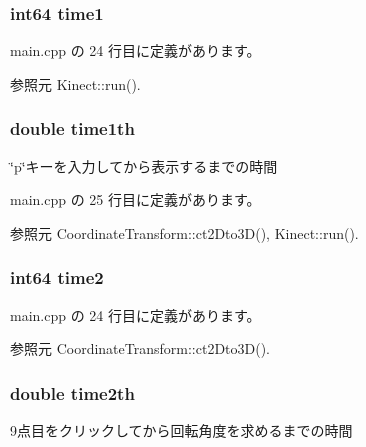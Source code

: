 \subsubsection[{time1}]{\setlength{\rightskip}{0pt plus 5cm}int64 time1}\label{_estimate_posture_8h_ae3b1b3b3559ae28919ff50cb10b4b19d}


 main.\-cpp の 24 行目に定義があります。



参照元 Kinect\-::run().

\subsubsection[{time1th}]{\setlength{\rightskip}{0pt plus 5cm}double time1th}\label{_estimate_posture_8h_ad7d664c3b63ac80cd47ebac01f9710b6}


\char`\"{}p\char`\"{}キーを入力してから表示するまでの時間 



 main.\-cpp の 25 行目に定義があります。



参照元 Coordinate\-Transform\-::ct2\-Dto3\-D(), Kinect\-::run().

\subsubsection[{time2}]{\setlength{\rightskip}{0pt plus 5cm}int64 time2}\label{_estimate_posture_8h_ac72f11471de429ffb48a21ee867e9c86}


 main.\-cpp の 24 行目に定義があります。



参照元 Coordinate\-Transform\-::ct2\-Dto3\-D().

\subsubsection[{time2th}]{\setlength{\rightskip}{0pt plus 5cm}double time2th}\label{_estimate_posture_8h_a682544663e12eb18837015a32fa84c81}


9点目をクリックしてから回転角度を求めるまでの時間 



